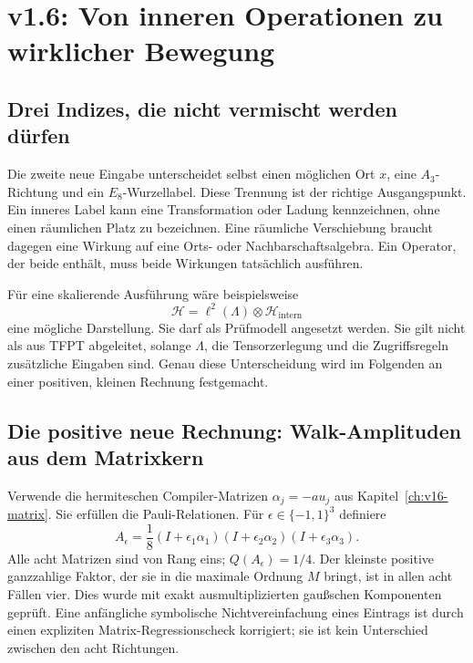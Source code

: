 \chapter{v1.6: Von inneren Operationen zu wirklicher Bewegung}
\label{ch:v16-operations}
\section{Drei Indizes, die nicht vermischt werden dürfen}
Die zweite neue Eingabe unterscheidet selbst einen möglichen Ort $x$, eine $A_3$-Richtung und ein $E_8$-Wurzellabel. Diese Trennung ist der richtige Ausgangspunkt. Ein inneres Label kann eine Transformation oder Ladung kennzeichnen, ohne einen räumlichen Platz zu bezeichnen. Eine räumliche Verschiebung braucht dagegen eine Wirkung auf eine Orts- oder Nachbarschaftsalgebra. Ein Operator, der beide enthält, muss beide Wirkungen tatsächlich ausführen.

Für eine skalierende Ausführung wäre beispielsweise
\begin{equation}
\mathcal H=\ell^2(\Lambda)\otimes\mathcal H_{\mathrm{intern}}
\end{equation}
eine mögliche Darstellung. Sie darf als Prüfmodell angesetzt werden. Sie gilt nicht als aus TFPT abgeleitet, solange $\Lambda$, die Tensorzerlegung und die Zugriffsregeln zusätzliche Eingaben sind. Genau diese Unterscheidung wird im Folgenden an einer positiven, kleinen Rechnung festgemacht.

\section{Die positive neue Rechnung: Walk-Amplituden aus dem Matrixkern}
Verwende die hermiteschen Compiler-Matrizen $\alpha_j=-au_j$ aus Kapitel~\ref{ch:v16-matrix}. Sie erfüllen die Pauli-Relationen. Für $\epsilon\in\{-1,1\}^3$ definiere
\begin{equation}
A_\epsilon=\frac18(I+\epsilon_1\alpha_1)(I+\epsilon_2\alpha_2)(I+\epsilon_3\alpha_3).
\label{eq:v16-walkA}
\end{equation}
Alle acht Matrizen sind von Rang eins; $Q(A_\epsilon)=1/4$. Der kleinste positive ganzzahlige Faktor, der sie in die maximale Ordnung $M$ bringt, ist in allen acht Fällen vier. Dies wurde mit exakt ausmultiplizierten gaußschen Komponenten geprüft. Eine anfängliche symbolische Nichtvereinfachung eines Eintrags ist durch einen expliziten Matrix-Regressionscheck korrigiert; sie ist kein Unterschied zwischen den acht Richtungen.

